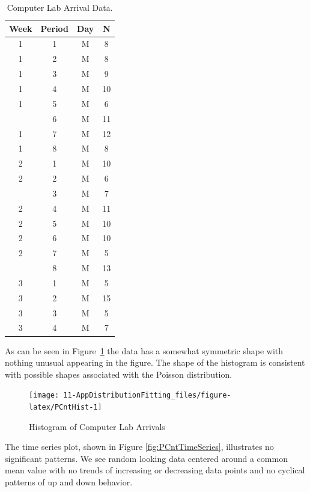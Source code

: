 \documentclass[
]{book}
\theoremstyle{definition}
\theoremstyle{definition}
\theoremstyle{definition}
\theoremstyle{definition}
\theoremstyle{remark}
\begin{document}
\begin{table}

\caption{\label{tab:PCntData}Computer Lab Arrival Data.}
\centering
\begin{tabular}[t]{cccc}
\toprule
Week & Period & Day & N\\
\midrule
1 & 1 & M & 8\\
1 & 2 & M & 8\\
1 & 3 & M & 9\\
1 & 4 & M & 10\\
1 & 5 & M & 6\\
\addlinespace
1 & 6 & M & 11\\
1 & 7 & M & 12\\
1 & 8 & M & 8\\
2 & 1 & M & 10\\
2 & 2 & M & 6\\
\addlinespace
2 & 3 & M & 7\\
2 & 4 & M & 11\\
2 & 5 & M & 10\\
2 & 6 & M & 10\\
2 & 7 & M & 5\\
\addlinespace
2 & 8 & M & 13\\
3 & 1 & M & 5\\
3 & 2 & M & 15\\
3 & 3 & M & 5\\
3 & 4 & M & 7\\
\bottomrule
\end{tabular}
\end{table}

As can be seen in Figure~\ref{fig:PCntHist} the data has a somewhat symmetric shape
with nothing unusual appearing in the figure. The shape of the histogram is consistent with possible shapes associated with the Poisson distribution.

\begin{figure}

{\centering \texttt{[image: 11-AppDistributionFitting\_files/figure-latex/PCntHist-1]} 

}

\caption{Histogram of Computer Lab Arrivals}\label{fig:PCntHist}
\end{figure}

The time series plot, shown in Figure \ref{fig:PCntTimeSeries}, illustrates no significant patterns. We see random looking data centered around a common mean value with no trends of increasing or decreasing data points and no cyclical patterns of up and down behavior.
\end{document}

